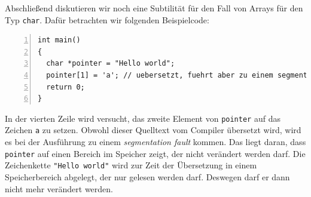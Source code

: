 Abschließend diskutieren wir noch eine Subtilität für den Fall von Arrays für den Typ \verb|char|.
Dafür betrachten wir folgenden Beispielcode:
\begin{lstlisting}[numbers=left]
int main()
{
  char *pointer = "Hello world";
  pointer[1] = 'a'; // uebersetzt, fuehrt aber zu einem segmentation fault
  return 0;
}
\end{lstlisting}
In der vierten Zeile wird versucht, das zweite Element von \verb|pointer| auf das Zeichen \verb|a| zu setzen.
Obwohl dieser Quelltext vom Compiler übersetzt wird, wird es bei der Ausführung zu einem \emph{segmentation fault} kommen.
Das liegt daran, dass \verb|pointer| auf einen Bereich im Speicher zeigt, der nicht verändert werden darf.
Die Zeichenkette \verb|"Hello world"| wird zur Zeit der Übersetzung in einem Speicherbereich abgelegt, der nur gelesen werden darf.
Deswegen darf er dann nicht mehr verändert werden.

\endinput
